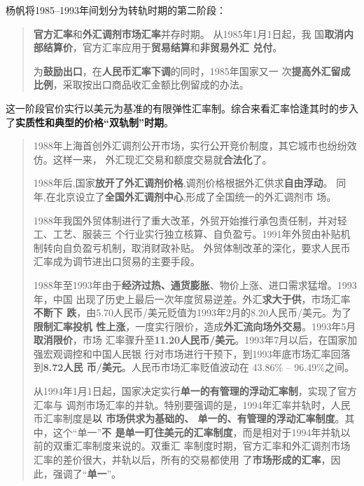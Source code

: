 杨帆将1985--1993年间划分为转轨时期的第二阶段：
\begin{quotation}
  \textbf{官方汇率}和\textbf{外汇调剂市场汇率}并存时期。 从1985年1月1日起，我
  国\textbf{取消内部结算价}，官方汇率应用于\textbf{贸易结算}和\textbf{非贸易外汇
    兑付}。

  为\textbf{鼓励出口}，在\textbf{人民币汇率下调}的同时，1985年国家又一
  次\textbf{提高外汇留成比例}，采取按出口商品收汇金额比例留成的办法。
\end{quotation}
这一阶段官价实行以美元为基准的有限弹性汇率制。综合来看汇率恰逢其时的步入
了\textbf{实质性和典型的价格“双轨制”时期}。

\begin{quotation}
1988年上海首创外汇调剂公开市场，实行公开竞价制度，其它城市也纷纷效仿。这样一来，
外汇现汇交易和额度交易就\textbf{合法化}了。\cite[769-770]{fengyunshi1b}

1988年后,国家\textbf{放开了外汇调剂价格},调剂价格根据外汇供求\textbf{自由浮动}。
同年,在北京设立了\textbf{全国外汇调剂中心},形成了全国统一的外汇调剂市
场。\cite{wangqiangshehui}

1988年我国外贸体制进行了重大改革，外贸开始推行承包责任制，并对轻工、工艺、服装三
个行业实行独立核算、自负盈亏。1991年外贸由补贴机制转向自负盈亏机制，取消财政补贴。
外贸体制改革的深化，要求人民币汇率成为调节进出口贸易的主要手段。

1988年至1993年由于\textbf{经济过热、通货膨胀}、物价上涨、进口需求猛增。1993年，中国
出现了历史上最后一次年度贸易逆差。外汇\textbf{求大于供}，市场汇率\textbf{不断下
  跌}，由5.70人民币/美元贬值为1993年2月的8.20人民币/美元。为了\textbf{限制汇率投机
  性上涨}，一度实行限价，造成\textbf{外汇流向场外交易}。1993年5月\textbf{取消限价}，市场
汇率骤升至\textbf{11.20人民币/美元}。1993年7月以后，在国家加强宏观调控和中国人民银
行对市场进行干预下，到1993年底市场汇率回落到\textbf{8.72人民
  币/美元}。\cite{huilvshi}人民币市场汇率贬值波动在 43.86\% -- 96.49\%之间。


从1994年1月1日起，国家决定实行\textbf{单一的有管理的浮动汇率制}，实现了官方汇率与
调剂市场汇率的并轨。特别要强调的是，1994年汇率并轨时，人民币汇率制度是\textbf{以
  市场供求为基础的、 单一的、有管理的浮动汇率制度}。其中，这个“单一”\textbf{不
  是单一盯住美元的汇率制度}，而是相对于1994年并轨以前的双重汇率制度来说的。双重汇
率制度时期，官方汇率和外汇调剂市场汇率的差价很大，并轨以后，所有的交易都使用
了\textbf{市场形成的汇率}，因此，强调了“\textbf{单一}”。\cite{guantaohuigai}

\end{quotation}

